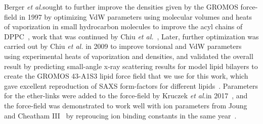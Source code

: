 \documentclass[12pt,openany,final]{book}
\newcommand{\etal}{\textit{et al.}}
\begin{document}
Berger \etal sought to further improve the densities given by the GROMOS force-field in 1997 
by optimizing VdW parameters using molecular volumes and
heats of vaporization in small hydrocarbon molecules to improve the acyl chains of DPPC~\cite{berger:1997},
work that was continued by Chiu \etal~\cite{chiu:1999:optimization,chiu:2003:structure}, 
Later, further optimization was carried out by Chiu \etal 
in 2009 to improve torsional and VdW parameters using experimental 
heats of vaporization and densities, and validated
the overall result by predicting small-angle x-ray scattering 
results for model lipid bilayers to create the GROMOS 43-A1S3 lipid force field that we use for this work, which gave excellent reproduction of SAXS form-factors for
different lipids~\cite{chiu:2009}. Parameters for the ether-links were added to the force-field by Kruczek \etal in 2017~\cite{kruczek:2017}, and the force-field
was demonstrated to work well with ion parameters from Joung and Cheatham III~\cite{joung:2008} by reproucing ion binding constants in the same
year~\cite{kruczek:2017}.


\end{document}
